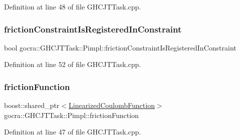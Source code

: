 Definition at line 48 of file G\+H\+C\+J\+T\+Task.\+cpp.

\hypertarget{structgocra_1_1GHCJTTask_1_1Pimpl_ad92c2fff381cdb00f6afb41671e923c5}{}\label{structgocra_1_1GHCJTTask_1_1Pimpl_ad92c2fff381cdb00f6afb41671e923c5} 
\subsubsection{\texorpdfstring{friction\+Constraint\+Is\+Registered\+In\+Constraint}{frictionConstraintIsRegisteredInConstraint}}
{\footnotesize\ttfamily bool gocra\+::\+G\+H\+C\+J\+T\+Task\+::\+Pimpl\+::friction\+Constraint\+Is\+Registered\+In\+Constraint}



Definition at line 52 of file G\+H\+C\+J\+T\+Task.\+cpp.

\hypertarget{structgocra_1_1GHCJTTask_1_1Pimpl_a777d7f0a74a42508154b153dbc0a3b44}{}\label{structgocra_1_1GHCJTTask_1_1Pimpl_a777d7f0a74a42508154b153dbc0a3b44} 
\subsubsection{\texorpdfstring{friction\+Function}{frictionFunction}}
{\footnotesize\ttfamily boost\+::shared\+\_\+ptr$<$\hyperlink{classocra_1_1LinearizedCoulombFunction}{Linearized\+Coulomb\+Function}$>$ gocra\+::\+G\+H\+C\+J\+T\+Task\+::\+Pimpl\+::friction\+Function}



Definition at line 47 of file G\+H\+C\+J\+T\+Task.\+cpp.

\hypertarget{structgocra_1_1GHCJTTask_1_1Pimpl_a20542f3c613a7f9c0771c2b5ac0b38eb}{}\label{structgocra_1_1GHCJTTask_1_1Pimpl_a20542f3c613a7f9c0771c2b5ac0b38eb} 
